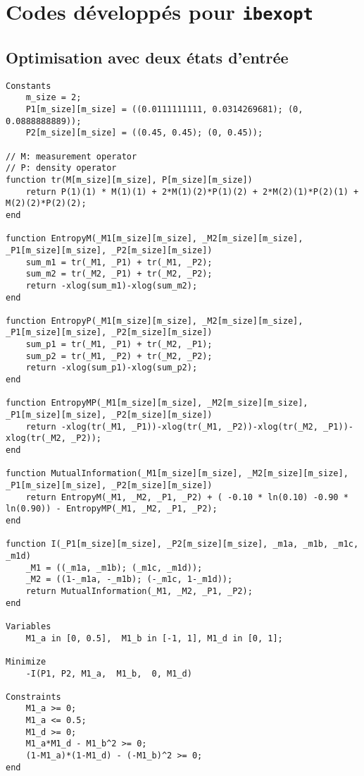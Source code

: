 \chapter{Codes développés pour \texttt{ibexopt}}
\label{appendix:ibexopt}

\section{Optimisation avec deux états d'entrée}
\begin{lstlisting}[style=CStyle]
Constants
    m_size = 2;
    P1[m_size][m_size] = ((0.0111111111, 0.0314269681); (0, 0.0888888889));
    P2[m_size][m_size] = ((0.45, 0.45); (0, 0.45));

// M: measurement operator
// P: density operator
function tr(M[m_size][m_size], P[m_size][m_size])
    return P(1)(1) * M(1)(1) + 2*M(1)(2)*P(1)(2) + 2*M(2)(1)*P(2)(1) + M(2)(2)*P(2)(2);
end

function EntropyM(_M1[m_size][m_size], _M2[m_size][m_size], _P1[m_size][m_size], _P2[m_size][m_size])
    sum_m1 = tr(_M1, _P1) + tr(_M1, _P2);
    sum_m2 = tr(_M2, _P1) + tr(_M2, _P2);
    return -xlog(sum_m1)-xlog(sum_m2);
end

function EntropyP(_M1[m_size][m_size], _M2[m_size][m_size], _P1[m_size][m_size], _P2[m_size][m_size])
    sum_p1 = tr(_M1, _P1) + tr(_M2, _P1);
    sum_p2 = tr(_M1, _P2) + tr(_M2, _P2);
    return -xlog(sum_p1)-xlog(sum_p2);
end

function EntropyMP(_M1[m_size][m_size], _M2[m_size][m_size], _P1[m_size][m_size], _P2[m_size][m_size])
    return -xlog(tr(_M1, _P1))-xlog(tr(_M1, _P2))-xlog(tr(_M2, _P1))-xlog(tr(_M2, _P2));
end

function MutualInformation(_M1[m_size][m_size], _M2[m_size][m_size], _P1[m_size][m_size], _P2[m_size][m_size])
    return EntropyM(_M1, _M2, _P1, _P2) + ( -0.10 * ln(0.10) -0.90 * ln(0.90)) - EntropyMP(_M1, _M2, _P1, _P2);
end

function I(_P1[m_size][m_size], _P2[m_size][m_size], _m1a, _m1b, _m1c, _m1d)
    _M1 = ((_m1a, _m1b); (_m1c, _m1d));
    _M2 = ((1-_m1a, -_m1b); (-_m1c, 1-_m1d));
    return MutualInformation(_M1, _M2, _P1, _P2);
end

Variables
    M1_a in [0, 0.5],  M1_b in [-1, 1], M1_d in [0, 1];

Minimize
    -I(P1, P2, M1_a,  M1_b,  0, M1_d)

Constraints
    M1_a >= 0;
    M1_a <= 0.5;
    M1_d >= 0;
    M1_a*M1_d - M1_b^2 >= 0;
    (1-M1_a)*(1-M1_d) - (-M1_b)^2 >= 0;
end
\end{lstlisting}

